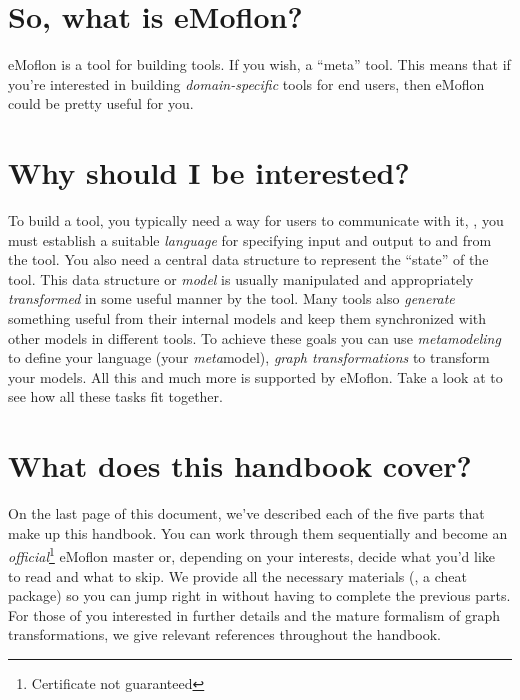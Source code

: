 \section{So, what is eMoflon?}

eMoflon is a tool for building tools.
If you wish, a \enquote{meta} tool. 
This means that if you're interested in building \emph{domain-specific} tools for end users, then eMoflon could be pretty useful for you.


\section{Why should I be interested?}

To build a tool, you typically need a way for users to communicate with it, \idest, you must establish a suitable \emph{language} for specifying input and output to and from the tool.
You also need a central data structure to represent the \enquote{state} of the tool.
This data structure or \emph{model} is usually manipulated and appropriately \emph{transformed} in some useful manner by the tool.
Many tools also \emph{generate} something useful from their internal models and keep them synchronized with other models in different tools.
To achieve these goals you can use \emph{metamodeling} to define your language (your \emph{meta}model), \emph{graph transformations} to transform your models.
All this and much more is supported by eMoflon.
Take a look at  to see how all these tasks fit together.

\section{What does this handbook cover?}
\label{sec:HandbookStructure}

On the last page of this document, we've described each of the five parts that make up this handbook.
You can work through them sequentially and become an \emph{official}\footnote{Certificate not guaranteed} eMoflon master or, depending on your interests, decide what you'd like to read and what to skip.
We provide all the necessary materials (\idest, a cheat package) so you can jump right in without having to complete the previous parts. 
For those of you interested in further details and the mature formalism of graph transformations, we give relevant references throughout the handbook.

